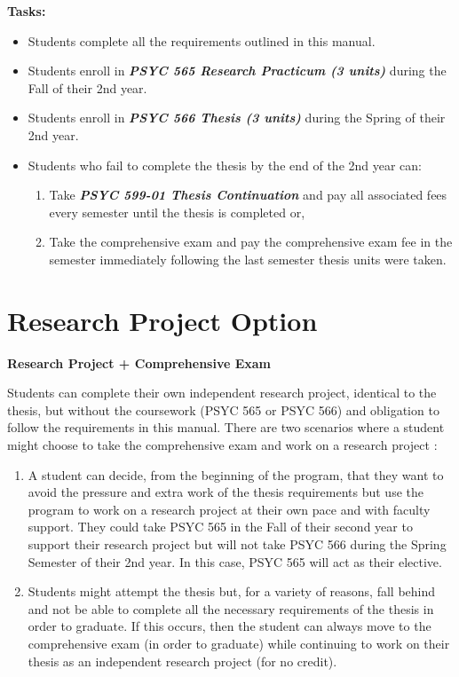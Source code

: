 \documentclass[openany]{book}
\providecommand{\tightlist}{%
  \setlength{\itemsep}{0pt}\setlength{\parskip}{0pt}}
\begin{document}
\textbf{Tasks:}

\begin{itemize}
\tightlist
\item
  Students complete all the requirements outlined in this manual.
\item
  Students enroll in \textbf{\emph{PSYC 565 Research Practicum (3 units)}} during the Fall of their 2nd year.
\item
  Students enroll in \textbf{\emph{PSYC 566 Thesis (3 units)}} during the Spring of their 2nd year.
\item
  Students who fail to complete the thesis by the end of the 2nd year can:

  \begin{enumerate}
  \def\labelenumi{\arabic{enumi}.}
  \tightlist
  \item
    Take \textbf{\emph{PSYC 599-01 Thesis Continuation}} and pay all associated fees every semester until the thesis is completed or,
  \item
    Take the comprehensive exam and pay the comprehensive exam fee in the semester immediately following the last semester thesis units were taken.
  \end{enumerate}
\end{itemize}

\hypertarget{research-project-option}{%
\section{Research Project Option}\label{research-project-option}}

\textbf{Research Project + Comprehensive Exam}

Students can complete their own independent research project, identical to the thesis, but without the coursework (PSYC 565 or PSYC 566) and obligation to follow the requirements in this manual. There are two scenarios where a student might choose to take the comprehensive exam and work on a research project :

\begin{enumerate}
\def\labelenumi{\arabic{enumi}.}
\item
  A student can decide, from the beginning of the program, that they want to avoid the pressure and extra work of the thesis requirements but use the program to work on a research project at their own pace and with faculty support. They could take PSYC 565 in the Fall of their second year to support their research project but will not take PSYC 566 during the Spring Semester of their 2nd year. In this case, PSYC 565 will act as their elective.
\item
  Students might attempt the thesis but, for a variety of reasons, fall behind and not be able to complete all the necessary requirements of the thesis in order to graduate. If this occurs, then the student can always move to the comprehensive exam (in order to graduate) while continuing to work on their thesis as an independent research project (for no credit).
\end{enumerate}
\end{document}
